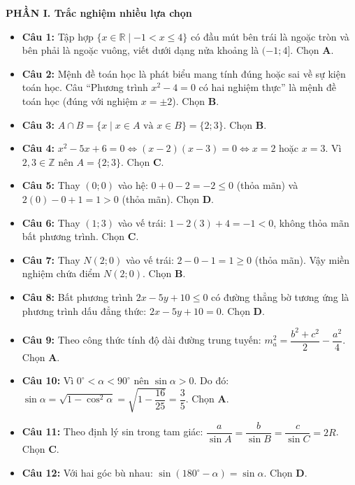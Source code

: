 \documentclass[12pt,a4paper]{article}
\begin{document}
\textbf{PHẦN I. Trắc nghiệm nhiều lựa chọn}
\begin{itemize}[leftmargin=0.6cm, itemsep=3pt]
    \item \textbf{Câu 1:} Tập hợp $\{x \in \mathbb{R} \mid -1 < x \le 4\}$ có đầu mút bên trái là ngoặc tròn và bên phải là ngoặc vuông, viết dưới dạng nửa khoảng là $(-1; 4]$. Chọn \textbf{A}.
    \item \textbf{Câu 2:} Mệnh đề toán học là phát biểu mang tính đúng hoặc sai về sự kiện toán học. Câu ``Phương trình $x^2 - 4 = 0$ có hai nghiệm thực'' là mệnh đề toán học (đúng với nghiệm $x = \pm 2$). Chọn \textbf{B}.
    \item \textbf{Câu 3:} $A \cap B = \{x \mid x \in A \text{ và } x \in B\} = \{2; 3\}$. Chọn \textbf{B}.
    \item \textbf{Câu 4:} $x^2 - 5x + 6 = 0 \iff (x - 2)(x - 3) = 0 \iff x = 2$ hoặc $x = 3$. Vì $2, 3 \in \mathbb{Z}$ nên $A = \{2; 3\}$. Chọn \textbf{C}.
    \item \textbf{Câu 5:} Thay $(0; 0)$ vào hệ: $0 + 0 - 2 = -2 \le 0$ (thỏa mãn) và $2(0) - 0 + 1 = 1 > 0$ (thỏa mãn). Chọn \textbf{D}.
    \item \textbf{Câu 6:} Thay $(1; 3)$ vào vế trái: $1 - 2(3) + 4 = -1 < 0$, không thỏa mãn bất phương trình. Chọn \textbf{C}.
    \item \textbf{Câu 7:} Thay $N(2; 0)$ vào vế trái: $2 - 0 - 1 = 1 \ge 0$ (thỏa mãn). Vậy miền nghiệm chứa điểm $N(2; 0)$. Chọn \textbf{B}.
    \item \textbf{Câu 8:} Bất phương trình $2x - 5y + 10 \le 0$ có đường thẳng bờ tương ứng là phương trình dấu đẳng thức: $2x - 5y + 10 = 0$. Chọn \textbf{D}.
    \item \textbf{Câu 9:} Theo công thức tính độ dài đường trung tuyến: $m_a^2 = \dfrac{b^2 + c^2}{2} - \dfrac{a^2}{4}$. Chọn \textbf{A}.
    \item \textbf{Câu 10:} Vì $0^\circ < \alpha < 90^\circ$ nên $\sin \alpha > 0$. Do đó:
    $\sin \alpha = \sqrt{1 - \cos^2 \alpha} = \sqrt{1 - \dfrac{16}{25}} = \dfrac{3}{5}$. Chọn \textbf{A}.
    \item \textbf{Câu 11:} Theo định lý sin trong tam giác: $\dfrac{a}{\sin A} = \dfrac{b}{\sin B} = \dfrac{c}{\sin C} = 2R$. Chọn \textbf{C}.
    \item \textbf{Câu 12:} Với hai góc bù nhau: $\sin(180^\circ - \alpha) = \sin \alpha$. Chọn \textbf{D}.
\end{itemize}
\end{document}
